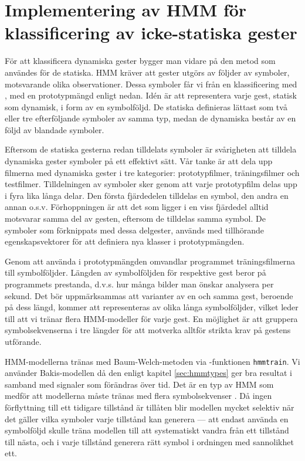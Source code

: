 \documentclass[../rapport_MVEX01-11-05]{subfiles}
\begin{document}
\section{Implementering av HMM för klassificering av icke-statiska gester}
För att klassificera dynamiska gester bygger man vidare på den metod som användes
för de statiska.  HMM kräver att gester utgörs av följder av symboler,
motsvarande olika observationer. Dessa symboler får vi från en 
klassificering med \knn, med en prototypmängd enligt nedan.
Idén är att representera varje gest, statisk som dynamisk, i form av en
symbolföljd.  De statiska definieras lättast som två eller tre efterföljande
symboler av samma typ, medan de dynamiska består av en följd av blandade
symboler.

Eftersom de statiska gesterna redan tilldelats
symboler är svårigheten att tilldela dynamiska gester symboler på ett effektivt sätt. Vår tanke
är att dela upp filmerna med dynamiska gester i tre kategorier: prototypfilmer, träningsfilmer och 
testfilmer. Tilldelningen av symboler sker genom att varje prototypfilm
delas upp i fyra lika långa delar. Den 
första fjärdedelen tilldelas en symbol, den andra en annan o.s.v.
Förhoppningen är att det som ligger i en viss fjärdedel alltid motsvarar samma
del av gesten, eftersom de tilldelas samma symbol.
De symboler som förknippats med dessa delgester, används med
tillhörande egenskapsvektorer för att definiera nya klasser i prototypmängden.

Genom att använda \knn i prototypmängden omvandlar programmet träningsfilmerna
till symbolföljder.
Längden av 
symbolföljden för respektive gest beror på programmets prestanda, d.v.s. hur många bilder 
man önskar analysera per sekund. Det bör uppmärksammas att varianter av en och
samma gest,
beroende på dess längd, kommer att representeras av olika långa symbolföljder,
vilket leder till att vi tränar flera HMM-modeller för varje gest.
En möjlighet är att gruppera symbolsekvenserna 
i tre längder för att motverka alltför strikta krav på gestens utförande. 

HMM-modellerna tränas med Baum-Welch-metoden via \MATLAB-funktionen \texttt{hmmtrain}.
Vi använder Bakis-modellen då den enligt kapitel \ref{sec:hmmtypes}
ger bra resultat i samband med signaler som förändras över tid.
Det är en typ av HMM som medför att
modellerna måste tränas med flera symbolsekvenser \cite{Rabiner89}.
Då ingen förflyttning till ett tidigare
tillstånd är tillåten blir modellen mycket selektiv när det gäller
vilka symboler varje tillstånd kan generera ---
att endast använda en symbolföljd skulle träna modellen till att systematiskt
vandra från ett tillstånd till nästa,
och i varje tillstånd generera rätt symbol i ordningen med sannolikhet ett.
\end{document}
